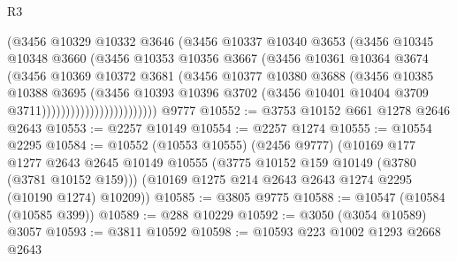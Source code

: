 \begin{lexlean}{R3}
\begin{coremodule}
                                (@3456
                                  @10329
                                  @10332
                                  @3646
                                  (@3456
                                    @10337
                                    @10340
                                    @3653
                                    (@3456
                                      @10345
                                      @10348
                                      @3660
                                      (@3456
                                        @10353
                                        @10356
                                        @3667
                                        (@3456
                                          @10361
                                          @10364
                                          @3674
                                          (@3456
                                            @10369
                                            @10372
                                            @3681
                                            (@3456
                                              @10377
                                              @10380
                                              @3688
                                              (@3456
                                                @10385
                                                @10388
                                                @3695
                                                (@3456
                                                  @10393
                                                  @10396
                                                  @3702
                                                  (@3456
                                                    @10401
                                                    @10404
                                                    @3709
                                                    @3711))))))))))))))))))))))))
    @9777
@10552 := @3753 @10152 @661 @1278 @2646 @2643
@10553 := @2257 @10149
@10554 := @2257 @1274
@10555 := @10554 @2295
@10584 := @10552
    (@10553 @10555)
    (@2456 @9777)
    (@10169
      @177
      @1277
      @2643
      @2645
      @10149
      @10555
      (@3775 @10152 @159 @10149 (@3780 (@3781 @10152 @159)))
      (@10169 @1275 @214 @2643 @2643 @1274 @2295 (@10190 @1274) @10209))
@10585 := @3805 @9775
@10588 := @10547 (@10584 (@10585 @399))
@10589 := @288 @10229
@10592 := @3050 (@3054 @10589) @3057
@10593 := @3811 @10592
@10598 := @10593 @223 @1002 @1293 @2668 @2643

\end{coremodule}
\end{lexlean}
